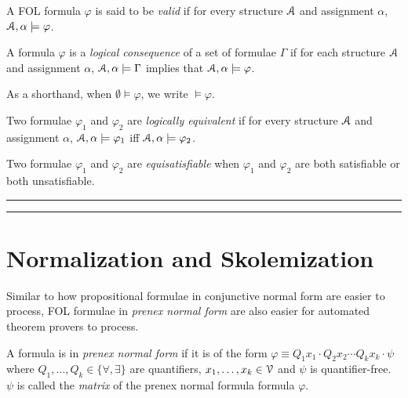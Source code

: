 \documentclass[11pt,usenames, dvipsnames]{article}
\begin{document}
\begin{definition}[Validity]
  A FOL formula $\varphi$ is said to be \emph{valid} if for every structure $\struct$ and assignment $\alpha$, $\struct, \alpha \models \varphi$.
\end{definition}

\begin{definition}
  A formula $\varphi$ is a \emph{logical consequence} of a set of formulae $\Gamma$ if for each structure $\struct$ and assignment $\alpha$, $\struct, \alpha \models \Gamma$ implies that $\struct, \alpha \models \varphi$.

  As a shorthand, when $\emptyset \models \varphi$, we write $\models \varphi$.
\end{definition}

\begin{definition}
  Two formulae $\varphi_1$ and $\varphi_2$ are \emph{logically equivalent} if for every structure $\struct$ and assignment $\alpha$, $\struct, \alpha \models \varphi_1$ iff $\struct, \alpha \models \varphi_2$.
\end{definition}

\begin{definition}[Equisatisfiability]
  Two formulae $\varphi_1$ and $\varphi_2$ are \emph{equisatisfiable} when $\varphi_1$ and $\varphi_2$ are both satisfiable or both unsatisfiable.
\end{definition}

\vspace{5truemm}
\hrule
\hrule

\section*{\large \centering Normalization and Skolemization}
\noindent

Similar to how propositional formulae in conjunctive normal form are easier to process, FOL formulae in \emph{prenex normal form} are also easier for automated theorem provers to process.

\begin{definition}
  A formula is in \emph{prenex normal form} if it is of the form $\varphi \equiv Q_1x_1 \cdot Q_2x_2 \cdots Q_kx_k \cdot \psi$ where $Q_1, \ldots, Q_k \in \{ \forall, \exists \}$ are quantifiers, $x_1, \ldots, x_k \in \vars$ and $\psi$ is quantifier-free. $\psi$ is called the \emph{matrix} of the prenex normal formula formula $\varphi$.
\end{definition}
\end{document}
